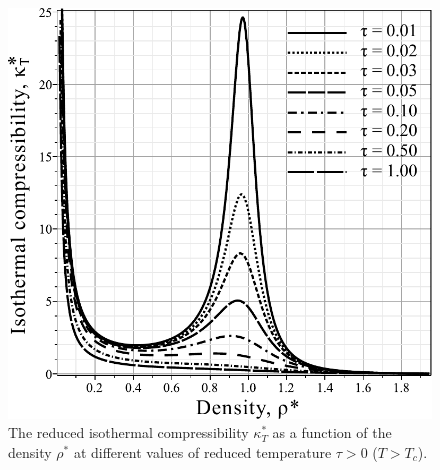 \documentclass[fleqn,twoside,twocolumn,nofootinbib,showkeys]{revtex4} %
\begin{document}
	\begin{figure}[htbp]
		\includegraphics[width=\column]{f2a}
		\vskip-3mm
		\caption{The reduced isothermal compressibility $\kappa^*_T$ as a function of the density $\rho^*$ at different values of reduced temperature $\tau > 0$ ($T > T_c$). 
		}
		\label{fig2a}
	\end{figure}
	
\end{document}
